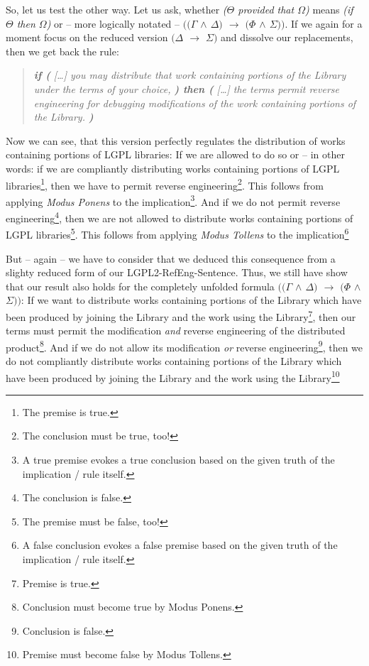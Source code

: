 So, let us test the other way. Let us ask, whether \emph{($\Theta$ provided
that $\Omega$)} means \emph{(if $\Theta$ then $\Omega$)} or -- more logically
notated -- \emph{$((\Gamma$ $\wedge$ $\Delta)$ $\rightarrow$ $(\Phi$ $\wedge$
$\Sigma))$}. If we again for a moment focus on the reduced version
\emph{$(\Delta$ $\rightarrow$ $\Sigma)$} and dissolve our replacements, then we
get back the rule:

\begin{quote}\noindent\emph{\textbf{if (} [\ldots] you may distribute that work
containing portions of the Library under the terms of your choice, \textbf{)
then (} [\ldots] the terms permit reverse engineering for debugging
modifications of the work containing portions of the Library.
\textbf{)}}\end{quote}

Now we can see, that this version perfectly regulates the distribution of works
containing portions of LGPL libraries: If we are allowed to do so or -- in other
words: if we are compliantly distributing works containing portions of LGPL
libraries\footnote{The premise is true.}, then we have to permit reverse
engineering\footnote{The conclusion must be true, too!}. This follows from
applying \emph{Modus Ponens} to the implication\footnote{A true premise evokes a
true conclusion based on the given truth of the implication / rule itself.}. And
if we do not permit reverse engineering\footnote{The conclusion is false.}, then
we are not allowed to distribute works containing portions of LGPL
libraries\footnote{The premise must be false, too!}. This follows from applying
\emph{Modus Tollens} to the implication\footnote{A false conclusion evokes a
false premise based on the given truth of the implication / rule itself.}

But -- again -- we have to consider that we deduced this consequence from a
slighty reduced form of our LGPL2-RefEng-Sentence. Thus, we still have show that
our result also holds for the completely unfolded formula \emph{$((\Gamma$
$\wedge$ $\Delta)$ $\rightarrow$ $(\Phi$ $\wedge$ $\Sigma))$}: If we want to
distribute works containing portions of the Library which have been produced by
joining the Library and the work using the Library\footnote{Premise is true.},
then our terms must permit the modification \emph{and} reverse engineering of
the distributed product\footnote{Conclusion must become true by Modus Ponens.}.
And if we do not allow its modification \emph{or} reverse
engineering\footnote{Conclusion is false.}, then we do not compliantly
distribute works containing portions of the Library which have been produced by
joining the Library and the work using the Library\footnote{Premise must become
false by Modus Tollens.}

